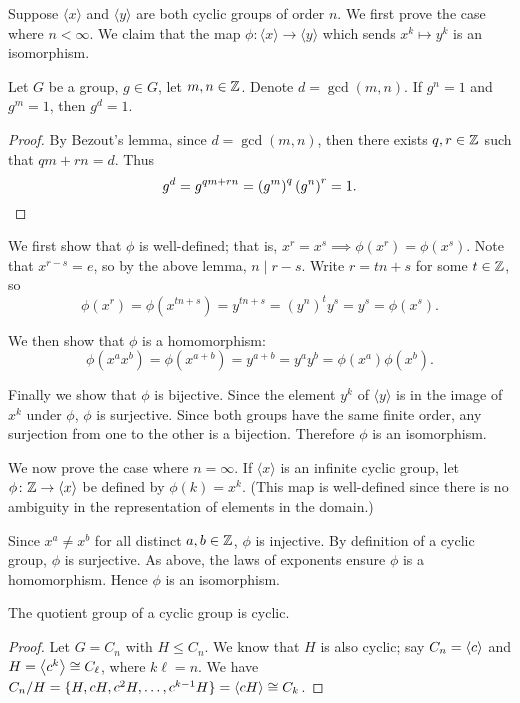 \begin{solution}
Suppose $\langle x\rangle$ and $\langle y\rangle$ are both cyclic groups of order $n$. We first prove the case where $n<\infty$. We claim that the map $\phi\colon \langle x\rangle\to\langle y\rangle$ which sends $x^k\mapsto y^k$ is an isomorphism.
\begin{lemma*}
Let $G$ be a group, $g\in G$, let $m,n\in\mathbb Z$. Denote $d=\gcd(m,n)$. If $g^n=1$ and $g^m=1$, then $g^d=1$.
\end{lemma*}
\begin{proof}
By Bezout's lemma, since $d=\gcd(m,n)$, then there exists $q,r\in\mathbb Z$ such that $qm+rn=d$. Thus
\[g^d=g^{qm+rn}=\left(g^m\right)^q\left(g^n\right)^r=1.\]
\end{proof}
We first show that $\phi$ is well-defined; that is, $x^r=x^s\implies \phi(x^r)=\phi(x^s)$. Note that $x^{r-s}=e$, so by the above lemma, $n\mid r-s$. Write $r=tn+s$ for some $t\in\mathbb Z$, so
\[\phi(x^r)=\phi(x^{tn+s})=y^{tn+s}=(y^n)^ty^s=y^s=\phi(x^s).\]

We then show that $\phi$ is a homomorphism:
\[\phi(x^a x^b)=\phi(x^{a+b})=y^{a+b}=y^a y^b=\phi(x^a)\phi(x^b).\]

Finally we show that $\phi$ is bijective. Since the element $y^k$ of $\langle y\rangle$ is in the image of $x^k$ under $\phi$, $\phi$ is surjective. Since both groups have the same finite order, any surjection from one to the other is a bijection. Therefore $\phi$ is an isomorphism.

We now prove the case where $n=\infty$. If $\langle x\rangle$ is an infinite cyclic group, let $\phi\colon\mathbb Z\to\langle x\rangle$ be defined by $\phi(k)=x^k$. (This map is well-defined since there is no ambiguity in the representation of elements in the domain.)

Since $x^a\neq x^b$ for all distinct $a,b\in\mathbb Z$, $\phi$ is injective. By definition of a cyclic group, $\phi$ is surjective. As above, the laws of exponents ensure $\phi$ is a homomorphism. Hence $\phi$ is an isomorphism.
\end{solution}

\begin{exercise}
The quotient group of a cyclic group is cyclic.
\end{exercise}

\begin{proof}
Let $G=C_n$ with $H\le C_n$. We know that $H$ is also cyclic; say $C_n=\left\langle c\right\rangle$ and $H=\left\langle c^k\right\rangle\cong C_\ell$, where $k\ell=n$. We have $C_n/H=\{H,cH,c^2H,\dots,c^{k-1}H\}=\left\langle cH\right\rangle\cong C_k$.
\end{proof}